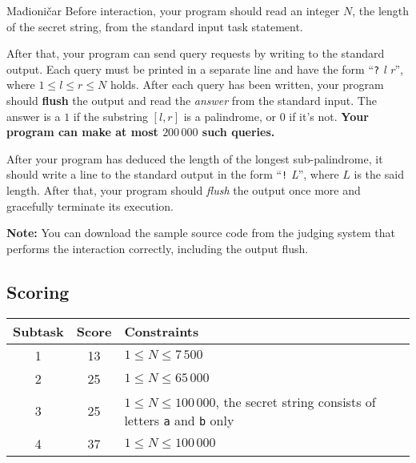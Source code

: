 \begin{statement}[
  problempoints=100,
  timelimit=5 seconds,
  memorylimit=512 MiB,
]{Mađioničar}
Before interaction, your program should read an integer $N$, the length of the
secret string, from the standard input task statement.

After that, your program can send query requests by writing to the standard
output. Each query must be printed in a separate line and have the
form ``\texttt{?} \textit{l r}'', where $1 \le l \le r \le N$ holds. After
each query has been written, your program should \textbf{flush} the output
and read the \textit{answer} from the standard input. The answer is a $1$ if
the substring $[l, r]$ is a palindrome, or $0$ if it's not.
\textbf{Your program can make at most $200\,000$ such queries.}

After your program has deduced the length of the longest sub-palindrome, it should write a line to
the standard output in the form ``\texttt{!} \textit{L}'', where
$L$ is the said length.
After that, your program should \textit{flush} the output once more
and gracefully terminate its execution.

\textbf{Note:} You can download the sample source code from the judging system
that performs the interaction correctly, including the output flush.

\subsection*{Scoring}

{\renewcommand{\arraystretch}{1.4}
  \setlength{\tabcolsep}{6pt}
  \begin{tabular}{ccl}
   Subtask & Score & Constraints \\ \midrule
    1 & 13 & $1 \leq N \leq 7\,500$ \\
    2 & 25 & $1 \leq N \leq 65\,000$ \\
    3 & 25 & $1 \leq N \leq 100\,000$, the secret string consists of letters \texttt{a} and \texttt{b} only \\
    4 & 37 & $1 \leq N \leq 100\,000$ \\
\end{tabular}}


\end{statement}
